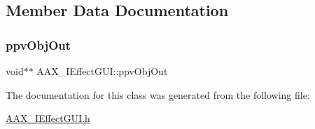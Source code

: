 \subsection{Member Data Documentation}
\mbox{\label{a01821_afcb1be35487e2a63f50ef2bc56f74c3a}} 
\subsubsection{\texorpdfstring{ppvObjOut}{ppvObjOut}}
{\footnotesize\ttfamily void$\ast$$\ast$ A\+A\+X\+\_\+\+I\+Effect\+G\+U\+I\+::ppv\+Obj\+Out}



The documentation for this class was generated from the following file\+:\begin{DoxyCompactItemize}
\item 
\mbox{\hyperlink{a00596}{A\+A\+X\+\_\+\+I\+Effect\+G\+U\+I.\+h}}\end{DoxyCompactItemize}
